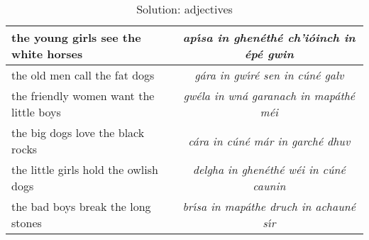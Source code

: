 \begin{table}[H]
{\begin{tabu}{|l|>{\itshape}c|}
    \midrule
    the young girls see the white horses & ap\'{\i}sa in ghen\'{e}th\'{e} ch'i\'{o}inch in \'{e}p\'{e} gwin\\
    \midrule
    the old men call the fat dogs & g\'{a}ra in gw\'{\i}r\'{e} sen in c\'{u}n\'{e} galv\\
    \midrule
    the friendly women want the little boys & gw\'{e}la in wn\'{a} garanach in map\'{a}th\'{e} m\'{e}i\\
    \midrule
    the big dogs love the black rocks & c\'{a}ra in c\'{u}n\'{e} m\'{a}r in garch\'{e} dhuv\\
    \midrule
    the little girls hold the owlish dogs & delgha in ghen\'{e}th\'{e} w\'{e}i in c\'{u}n\'{e} caunin\\
    \midrule
    the bad boys break the long stones & br\'{\i}sa in map\'{a}the druch in achaun\'{e} s\'{\i}r\\
    \bottomrule
  \end{tabu}
}
\label{solution_adjectives}
\caption{Solution: adjectives}
\end{table}
